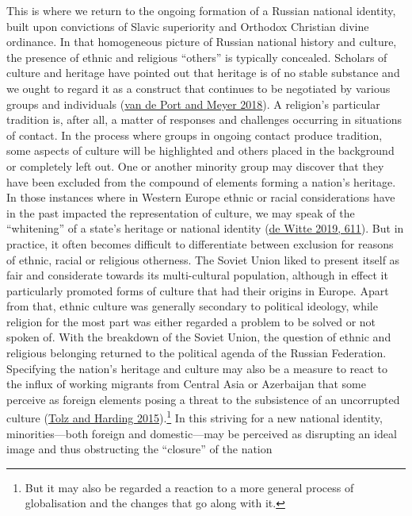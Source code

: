 \documentclass[
  english,
  a4paper,
  DIV=12,
  footlines=2.1,
  usegeometry=true]{scrartcl}
\begin{document}
\leavevmode\marginpar{\textcolor{parnum}{{[}12{]}}}This is where we
return to the ongoing formation of a Russian national identity, built
upon convictions of Slavic superiority and Orthodox Christian divine
ordinance. In that homogeneous picture of Russian national history and
culture, the presence of ethnic and religious ``others'' is typically
concealed. Scholars of culture and heritage have pointed out that
heritage is of no stable substance and we ought to regard it as a
construct that continues to be negotiated by various groups and
individuals (\protect\hyperlink{ref-port_introduction_2018}{van de Port
and Meyer 2018}). A religion's particular tradition is, after all, a
matter of responses and challenges occurring in situations of contact.
In the process where groups in ongoing contact produce tradition, some
aspects of culture will be highlighted and others placed in the
background or completely left out. One or another minority group may
discover that they have been excluded from the compound of elements
forming a nation's heritage. In those instances where in Western Europe
ethnic or racial considerations have in the past impacted the
representation of culture, we may speak of the ``whitening'' of a
state's heritage or national identity
(\protect\hyperlink{ref-witte_black_2019}{de Witte 2019, 611}). But in
practice, it often becomes difficult to differentiate between exclusion
for reasons of ethnic, racial or religious otherness. The Soviet Union
liked to present itself as fair and considerate towards its
multi-cultural population, although in effect it particularly promoted
forms of culture that had their origins in Europe. Apart from that,
ethnic culture was generally secondary to political ideology, while
religion for the most part was either regarded a problem to be solved or
not spoken of. With the breakdown of the Soviet Union, the question of
ethnic and religious belonging returned to the political agenda of the
Russian Federation. Specifying the nation's heritage and culture may
also be a measure to react to the influx of working migrants from
Central Asia or Azerbaijan that some perceive as foreign elements posing
a threat to the subsistence of an uncorrupted culture
(\protect\hyperlink{ref-tolz_compatriots_2015}{Tolz and Harding
2015}).\footnote{But it may also be regarded a reaction to a more
  general process of globalisation and the changes that go along with
  it.} In this striving for a new national identity, minorities---both
foreign and domestic---may be perceived as disrupting an ideal image and
thus obstructing the ``closure'' of the nation
\end{document}
